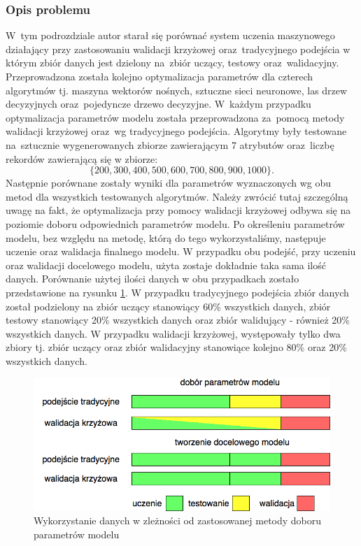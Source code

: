 \subsubsection{Opis problemu}
W~tym podrozdziale autor starał się porównać system uczenia maszynowego działający przy zastosowaniu walidacji krzyżowej oraz~tradycyjnego podejścia w którym zbiór danych jest dzielony na~zbiór uczący, testowy oraz~walidacyjny. Przeprowadzona została kolejno optymalizacja parametrów dla czterech algorytmów tj. maszyna wektorów nośnych, sztuczne sieci neuronowe, las drzew decyzyjnych oraz~pojedyncze drzewo decyzyjne. W~każdym przypadku optymalizacja parametrów modelu została przeprowadzona za~pomocą metody walidacji krzyżowej oraz~wg tradycyjnego podejścia.  Algorytmy były testowane na~sztucznie wygenerowanych zbiorze zawierającym 7 atrybutów oraz~liczbę rekordów zawierającą się w zbiorze:
\begin{equation*}
\{200, 300, 400, 500, 600, 700, 800, 900, 1000\}. 
\end{equation*}
Następnie porównane zostały wyniki dla parametrów wyznaczonych wg obu metod dla wszystkich testowanych algorytmów. Należy zwrócić tutaj szczególną uwagę na fakt, że optymalizacja przy pomocy walidacji krzyżowej odbywa się na poziomie doboru odpowiednich parametrów modelu. Po określeniu parametrów modelu, bez względu na metodę, którą do tego wykorzystaliśmy, następuje uczenie oraz walidacja finalnego modelu. W przypadku obu podejść, przy uczeniu oraz walidacji docelowego modelu, użyta zostaje dokładnie taka sama ilość danych. Porównanie użytej ilości danych w obu przypadkach zostało przedstawione na rysunku \ref{cvdata}. W przypadku tradycyjnego podejścia zbiór danych został podzielony na zbiór uczący stanowiący 60\% wszystkich danych, zbiór testowy stanowiący 20\% wszystkich danych oraz zbiór walidujący - również 20\% wszystkich danych. W przypadku walidacji krzyżowej, występowały tylko dwa zbiory tj. zbiór uczący oraz zbiór walidacyjny stanowiące kolejno 80\% oraz 20\% wszystkich danych. 

\begin{figure}[ht!]
\centering
\includegraphics[scale=0.6]{res/cvdata.png}
\caption[Caption for LOF]{Wykorzystanie danych w zleżności od zastosowanej metody doboru parametrów modelu\label{cvdata}}
\end{figure} 

